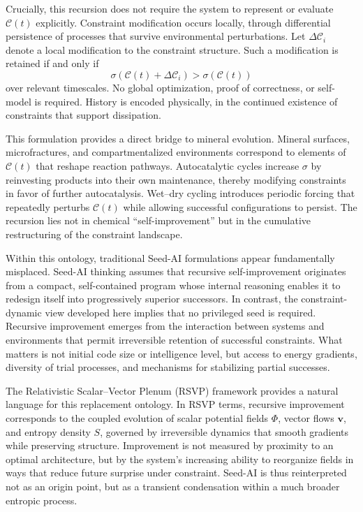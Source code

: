 \documentclass[11pt]{article}
\begin{document}
Crucially, this recursion does not require the system to represent or evaluate $\mathcal{C}(t)$ explicitly. Constraint modification occurs locally, through differential persistence of processes that survive environmental perturbations. Let $\Delta\mathcal{C}_i$ denote a local modification to the constraint structure. Such a modification is retained if and only if
\begin{equation}
\sigma(\mathcal{C}(t) + \Delta\mathcal{C}_i) > \sigma(\mathcal{C}(t))
\end{equation}
over relevant timescales. No global optimization, proof of correctness, or self-model is required. History is encoded physically, in the continued existence of constraints that support dissipation.

This formulation provides a direct bridge to mineral evolution. Mineral surfaces, microfractures, and compartmentalized environments correspond to elements of $\mathcal{C}(t)$ that reshape reaction pathways. Autocatalytic cycles increase $\sigma$ by reinvesting products into their own maintenance, thereby modifying constraints in favor of further autocatalysis. Wet--dry cycling introduces periodic forcing that repeatedly perturbs $\mathcal{C}(t)$ while allowing successful configurations to persist. The recursion lies not in chemical ``self-improvement'' but in the cumulative restructuring of the constraint landscape.

Within this ontology, traditional Seed-AI formulations appear fundamentally misplaced. Seed-AI thinking assumes that recursive self-improvement originates from a compact, self-contained program whose internal reasoning enables it to redesign itself into progressively superior successors. In contrast, the constraint-dynamic view developed here implies that no privileged seed is required. Recursive improvement emerges from the interaction between systems and environments that permit irreversible retention of successful constraints. What matters is not initial code size or intelligence level, but access to energy gradients, diversity of trial processes, and mechanisms for stabilizing partial successes.

The Relativistic Scalar–Vector Plenum (RSVP) framework provides a natural language for this replacement ontology. In RSVP terms, recursive improvement corresponds to the coupled evolution of scalar potential fields $\Phi$, vector flows $\mathbf{v}$, and entropy density $S$, governed by irreversible dynamics that smooth gradients while preserving structure. Improvement is not measured by proximity to an optimal architecture, but by the system’s increasing ability to reorganize fields in ways that reduce future surprise under constraint. Seed-AI is thus reinterpreted not as an origin point, but as a transient condensation within a much broader entropic process.
\end{document}
